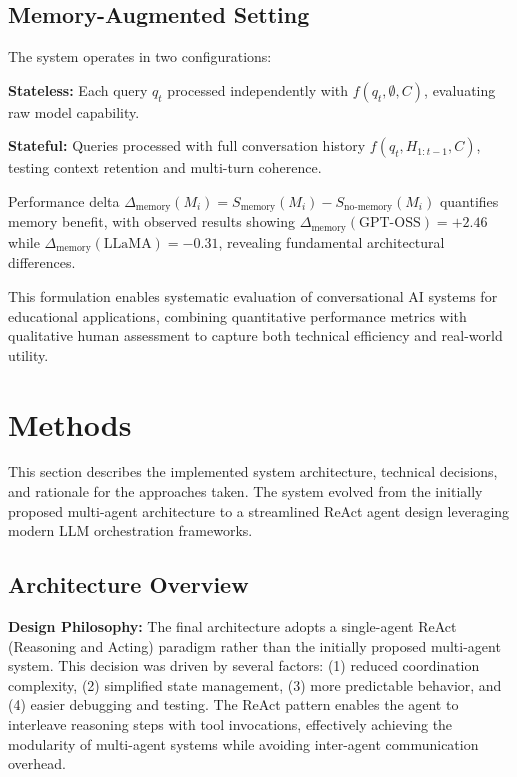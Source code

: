 \documentclass{article}
\begin{document}
\subsection{Memory-Augmented Setting}

The system operates in two configurations:

\textbf{Stateless:} Each query $q_t$ processed independently with $f(q_t, \emptyset, C)$, evaluating raw model capability.

\textbf{Stateful:} Queries processed with full conversation history $f(q_t, H_{1:t-1}, C)$, testing context retention and multi-turn coherence.

Performance delta $\Delta_{\text{memory}}(M_i) = S_{\text{memory}}(M_i) - S_{\text{no-memory}}(M_i)$ quantifies memory benefit, with observed results showing $\Delta_{\text{memory}}(\text{GPT-OSS}) = +2.46$ while $\Delta_{\text{memory}}(\text{LLaMA}) = -0.31$, revealing fundamental architectural differences.

This formulation enables systematic evaluation of conversational AI systems for educational applications, combining quantitative performance metrics with qualitative human assessment to capture both technical efficiency and real-world utility.

\section{Methods}

This section describes the implemented system architecture, technical decisions, and rationale for the approaches taken. The system evolved from the initially proposed multi-agent architecture to a streamlined ReAct agent design leveraging modern LLM orchestration frameworks.

\subsection{Architecture Overview}

\textbf{Design Philosophy:} The final architecture adopts a single-agent ReAct (Reasoning and Acting) paradigm \cite{yao2023react} rather than the initially proposed multi-agent system. This decision was driven by several factors: (1) reduced coordination complexity, (2) simplified state management, (3) more predictable behavior, and (4) easier debugging and testing. The ReAct pattern enables the agent to interleave reasoning steps with tool invocations, effectively achieving the modularity of multi-agent systems while avoiding inter-agent communication overhead.
\end{document}
